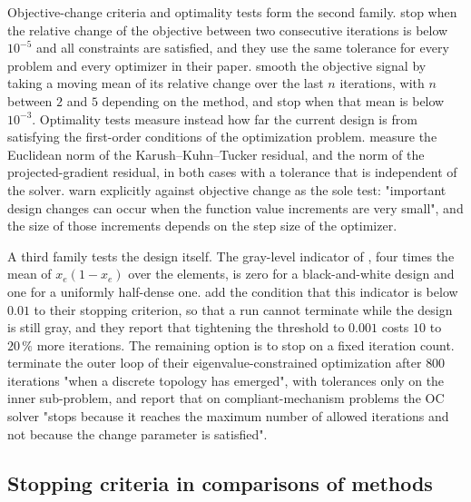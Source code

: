 \documentclass[11pt,a4paper]{article}
\begin{document}
Objective-change criteria and optimality tests form the second family. \citet{Dunning2025} stop when the relative change of the objective between two consecutive iterations is below $10^{-5}$ and all constraints are satisfied, and they use the same tolerance for every problem and every optimizer in their paper. \citet{Yago2022} smooth the objective signal by taking a moving mean of its relative change over the last $n$ iterations, with $n$ between $2$ and $5$ depending on the method, and stop when that mean is below $10^{-3}$. Optimality tests measure instead how far the current design is from satisfying the first-order conditions of the optimization problem. \citet{RojasLabanda2015} measure the Euclidean norm of the Karush--Kuhn--Tucker residual, and \citet{Kim2025} the norm of the projected-gradient residual, in both cases with a tolerance that is independent of the solver. \citet{Kim2025} warn explicitly against objective change as the sole test: "important design changes can occur when the function value increments are very small", and the size of those increments depends on the step size of the optimizer.

A third family tests the design itself. The gray-level indicator of \citet{Sigmund2007}, four times the mean of $x_e(1 - x_e)$ over the elements, is zero for a black-and-white design and one for a uniformly half-dense one. \citet{Dunning2025} add the condition that this indicator is below $0.01$ to their stopping criterion, so that a run cannot terminate while the design is still gray, and they report that tightening the threshold to $0.001$ costs $10$ to $20\,\%$ more iterations. The remaining option is to stop on a fixed iteration count. \citet{Zhang2023} terminate the outer loop of their eigenvalue-constrained optimization after $800$ iterations "when a discrete topology has emerged", with tolerances only on the inner sub-problem, and \citet{RojasLabanda2015} report that on compliant-mechanism problems the OC solver "stops because it reaches the maximum number of allowed iterations and not because the change parameter is satisfied".

\subsection{Stopping criteria in comparisons of methods}
\end{document}
